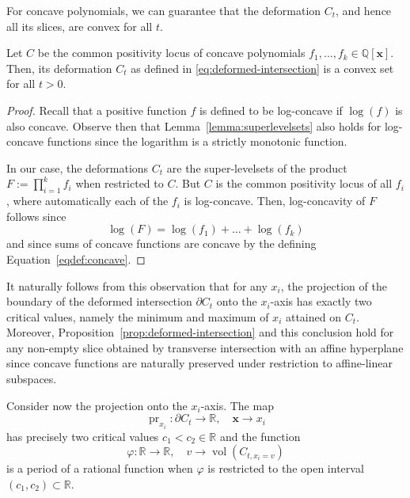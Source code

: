 \documentclass[sigconf, nonacm]{acmart} %
\DeclareMathOperator{\vol}{vol}
\newcommand{\pr}[0]{{\operatorname{pr}}}
\begin{document}
For concave polynomials, we can guarantee that the deformation $C_t$, and hence all its slices, are convex for all $t$.
\begin{proposition}\label{prop:deformed-intersection}
    Let $C$ be the common positivity locus of concave polynomials $f_1,\ldots,f_k \in \mathbb{Q}[\mathbf x]$. Then,
    its deformation $C_t$ as defined in \eqref{eq:deformed-intersection} is a convex set for all $t>0$.
\end{proposition}
\begin{proof}
    Recall that a positive function $f$ is defined to be log-concave if $\log(f)$ is also concave. Observe then that Lemma~\ref{lemma:superlevelsets} also holds for log-concave functions since the logarithm is a strictly monotonic function.
    
    In our case, the deformations $C_t$ are the super-levelsets of the product $F:=\prod^k_{i=1} f_i$ when restricted to $C$. But $C$ is the common positivity locus of all $f_i$, where automatically each of the $f_i$ is log-concave.
    Then, log-concavity of $F$ follows since 
    \begin{equation*}
        \log(F) = \log(f_1) + \ldots + \log(f_k)
    \end{equation*}
    and since sums of concave functions are concave by the defining Equation~\eqref{eqdef:concave}.
\end{proof}

It naturally follows from this observation that for any $x_i$, the projection of the boundary of the deformed intersection $\partial C_t$ onto the $x_i$-axis has exactly two critical values, namely the minimum and maximum of $x_i$ attained on $C_t$. Moreover, Proposition~\ref{prop:deformed-intersection} and this conclusion hold for any non-empty slice obtained by transverse intersection with an affine hyperplane since concave functions are naturally preserved under restriction to affine-linear subspaces. 


Consider now the projection onto the $x_i$-axis. The map
\begin{equation}
    \pr_{x_i} : \partial C_t \rightarrow \mathbb{R}, \quad \mathbf{x} \to x_i
\end{equation}
 has precisely two critical values $c_1 < c_2 \in \mathbb{R}$ and the function 
\begin{equation}
    \varphi: \mathbb{R} \rightarrow \mathbb{R}, \quad v \to \vol(C_{t, x_i = v})
\end{equation}
is a period of a rational function when $\varphi$ is restricted to the open interval $(c_1, c_2) \subset \mathbb{R}$.
\end{document}
